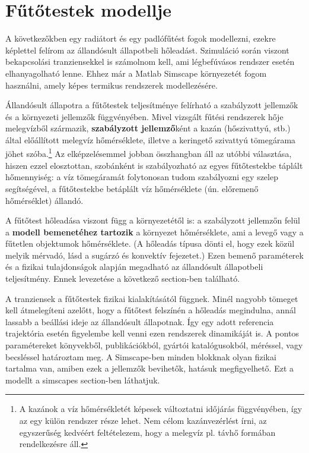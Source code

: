 \chapter{Fűtőtestek modellje}


A következőkben egy radiátort és egy padlófűtést fogok modellezni, ezekre képlettel felírom az állandósult állapotbeli hőleadást. Szimuláció során viszont bekapcsolási tranziensekkel is számolnom kell, ami légbefúvásos rendszer esetén elhanyagolható lenne. Ehhez már a Matlab Simscape környezetét fogom használni, amely képes termikus rendszerek modellezésére.

Állandósult állapotra a fűtőtestek teljesítménye felírható a szabályzott jellemzők és a környezeti jellemzők függvényében. Mivel vizsgált fűtési rendszerek hője melegvízből származik, \textbf{szabályzott jellemző}ként a kazán (hőszivattyú, stb.) által előállított melegvíz hőmérséklete, illetve a keringető szivattyú tömegárama jöhet szóba.\footnote{A kazánok a víz hőmérsékletét képesek változtatni időjárás függvényében, így az egy külön rendszer része lehet. Nem célom kazánvezérlést írni, az egyszerűség kedvéért feltételezem, hogy a melegvíz pl. távhő formában rendelkezésre áll.} Az elképzelésemmel jobban összhangban áll az utóbbi választása, hiszen ezzel elosztottan, szobánként is szabályozható az egyes fűtőtestekbe táplált hőmennyiség: a víz tömegáramát folytonosan tudom szabályozni egy szelep segítségével, a fűtőtestekbe betáplált víz hőmérséklete (ún. előremenő hőmérséklet) állandó.

A fűtőtest hőleadása viszont függ a környezetétől is: a szabályzott jellemzőn felül a \textbf{modell bemenetéhez tartozik} a környezet hőmérséklete, ami a levegő vagy a fűtetlen objektumok hőmérséklete. (A hőleadás típusa dönti el, hogy ezek közül melyik mérvadó, lásd a sugárzó és konvektív fejezetet.)
Ezen bemenő paraméterek és a fizikai tulajdonságok alapján megadható az állandósult állapotbeli teljesítmény. Ennek levezetése a következő section-ben található.

A tranziensek a fűtőtestek fizikai kialakításától függnek. Minél nagyobb tömeget kell átmelegíteni azelőtt, hogy a fűtőtest felszínén a hőleadás megindulna, annál lassabb a beállási ideje az állandósult állapotnak. Így egy adott referencia trajektória esetén figyelembe kell venni ezen rendszerek dinamikáját is. A pontos paramétereket könyvekből, publikációkból, gyártói katalógusokból, méréssel, vagy becsléssel határoztam meg. A Simscape-ben minden blokknak olyan fizikai tartalma van, amiben ezek a jellemzők bevihetők, hatásuk megfigyelhető. Ezt a modellt a simscapes section-ben láthatjuk.


